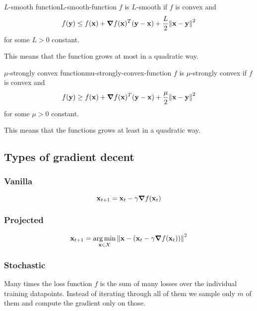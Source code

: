 \documentclass[12pt]{extarticle}
\renewcommand{\vec}[1]{\bvec{#1}}
\numberwithin{equation}{subsection}
\begin{document}
\begin{definition}{$L$-smooth function}{L-smooth-function}
	$f$ is $L$-smooth if $f$ is convex and
	\begin{equation}
		f(\vec y) \leq f(\vec x) + \grad f(\vec x)^T (\vec y - \vec x)
		+ \frac{L}{2} \norm{\vec x - \vec y}^2
	\end{equation}
	for some $L > 0$ constant.
\end{definition}

This means that the function grows at most in a quadratic way.

\begin{definition}{$\mu$-strongly convex function}{mu-strongly-convex-function}
	$f$ is $\mu$-strongly convex if $f$ is convex and
	\begin{equation}
		f(\vec y) \geq f(\vec x) + \grad f(\vec x)^T (\vec y - \vec x) + \frac{\mu}{2} \norm{\vec x - \vec y}^2
	\end{equation}
	for some $\mu > 0$ constant.
\end{definition}
This means that the functions grows at least in a quadratic way.

\subsection{Types of gradient decent}

\subsubsection{Vanilla}

\begin{equation}
	\vec x_{t+1} = \vec x_t - \gamma \grad f(\vec x_t)
\end{equation}

\subsubsection{Projected}

\begin{equation}
	\vec x_{t+1} = \argmin_{\vec x \in X}\norm{ \vec x - (\vec x_t - \gamma \grad f(\vec x_t)) }^2
\end{equation}

\subsubsection{Stochastic}

Many times the loss function $f$ is the sum of many losses over the individual training datapoints.
Instead of iterating through all of them we sample only $m$ of them and compute the gradient only on
those.
\end{document}
